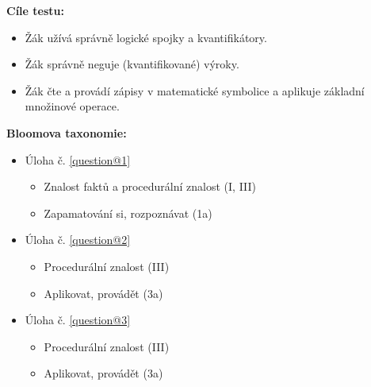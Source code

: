 \documentclass[12pt,a4paper,addpoints]{exam}
\begin{document}
\begin{titlepage}
\begin{center}
                \textbf{Cíle testu:}    
                        \vspace{-5mm}
                        \footnotesize
                        \begin{itemize}[noitemsep,topsep=0pt]
                                \item Žák užívá správně logické spojky a kvantifikátory. 
                                \item Žák správně neguje (kvantifikované) výroky. 
                                \item Žák čte a provádí zápisy v matematické symbolice a aplikuje základní množinové operace.
                        \end{itemize}
                \normalsize
                \textbf{Bloomova taxonomie:}
                        \vspace{-5mm}
                        \footnotesize
                        \begin{itemize}[noitemsep,topsep=0pt]
                        \item Úloha č. \ref{question@1}\\
                                \begin{itemize}[noitemsep,topsep=0pt]
                                        \item Znalost faktů a procedurální znalost (I, III)
                                        \item Zapamatování si, rozpoznávat (1a)
                                \end{itemize}
                        \item Úloha č. \ref{question@2}\\
                                \begin{itemize}[noitemsep,topsep=0pt]
                                        \item Procedurální znalost (III)
                                        \item Aplikovat, provádět (3a)
                                \end{itemize}
                        \item Úloha č. \ref{question@3}\\
                                \begin{itemize}[noitemsep,topsep=0pt]
                                        \item Procedurální znalost (III)
                                        \item Aplikovat, provádět (3a)

\end{itemize}
\end{itemize}
\end{center}
\end{titlepage}
\end{document}
